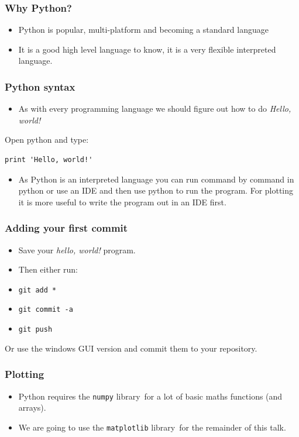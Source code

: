 \documentclass{beamer}
\begin{document}
\begin{frame}
\frametitle{Why Python?} 
\begin{itemize}
	\item Python is popular, multi-platform and becoming a standard language\footnotemark\ 
	\item It is a good high level language to know, it is a very flexible interpreted language.
\end{itemize}
\end{frame}

\begin{frame}
\frametitle{Python syntax} 
\begin{itemize}
	\item As with every programming language we should figure out how to do \textit{Hello, world!}
\end{itemize}
Open python and type:
\begin{verbatim}
print 'Hello, world!'
\end{verbatim}
\begin{itemize}
\item As Python is an interpreted language you can run command by command in python or use an IDE and then use python to run the program. For plotting it is more useful to write the program out in an IDE first. 
\end{itemize}
\end{frame}

\begin{frame}
	\frametitle{Adding your first commit}
\begin{itemize}
	\item Save your \textit{hello, world!} program. 
	\item Then either run: 
	\item \texttt{git add *}
	\item \texttt{git commit -a}
	\item \texttt{git push}
\end{itemize}

Or use the windows GUI version and commit them to your repository.
\end{frame}


\begin{frame}
\frametitle{Plotting}
\begin{itemize}
	\item Python requires the \texttt{numpy} library\footnotemark\ for a lot of basic maths functions (and arrays).
	\item We are going to use the \texttt{matplotlib} library\footnotemark\ for the remainder of this talk. 
\end{itemize}
\end{frame}
\end{document}
